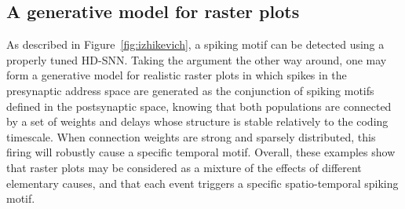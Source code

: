 \documentclass[runningheads]{llncs}
\begin{document}
\subsection{A generative model for raster plots}

As described in Figure~\ref{fig:izhikevich}, a spiking motif can be detected using a properly tuned HD-SNN. Taking the argument the other way around, one may form a generative model for realistic raster plots in which spikes in the presynaptic address space are generated as the conjunction of spiking motifs defined in the postsynaptic space, knowing that both populations are connected by a set of weights and delays whose structure is stable relatively to the coding timescale. When connection weights are strong and sparsely distributed, this firing will robustly cause a specific temporal motif. Overall, these examples show that raster plots may be considered as a mixture of the effects of different elementary causes, and that each event triggers a specific spatio-temporal spiking motif. 
\end{document}

